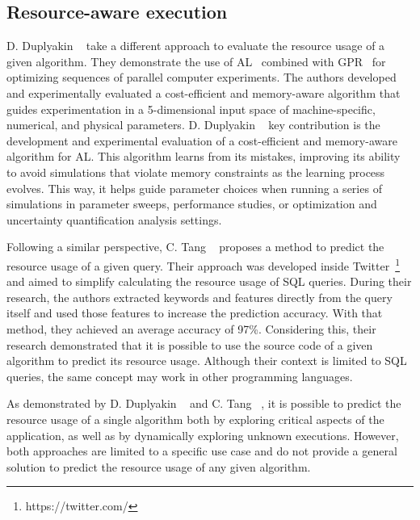 \subsection{Resource-aware execution}
\label{subsec:resource-aware-execution}

D. Duplyakin \etal~\cite{duplyakin2018} take a different approach to evaluate the resource usage of a given algorithm.
They demonstrate the use of \ac{AL}~\cite{active-learning} combined with \ac{GPR}~\cite{gaussian-process-regression} for optimizing sequences of parallel computer experiments.
The authors developed and experimentally evaluated a cost-efficient and memory-aware algorithm that guides experimentation in a 5-dimensional input space of machine-specific, numerical, and physical parameters.
D. Duplyakin \etal~\cite{duplyakin2018} key contribution is the development and experimental evaluation of a cost-efficient and memory-aware algorithm for \ac{AL}.
This algorithm learns from its mistakes, improving its ability to avoid simulations that violate memory constraints as the learning process evolves.
This way, it helps guide parameter choices when running a series of simulations in parameter sweeps, performance studies, or optimization and uncertainty quantification analysis settings.

Following a similar perspective, C. Tang \etal~\cite{tang2021} proposes a method to predict the resource usage of a given query.
Their approach was developed inside Twitter~\footnote{https://twitter.com/} and aimed to simplify calculating the resource usage of SQL queries.
During their research, the authors extracted keywords and features directly from the query itself and used those features to increase the prediction accuracy.
With that method, they achieved an average accuracy of 97\%.
Considering this, their research demonstrated that it is possible to use the source code of a given algorithm to predict its resource usage.
Although their context is limited to SQL queries, the same concept may work in other programming languages.

As demonstrated by D. Duplyakin \etal~\cite{duplyakin2018} and C. Tang \etal~\cite{tang2021}, it is possible to predict the resource usage of a single algorithm both by exploring critical aspects of the application, as well as by dynamically exploring unknown executions.
However, both approaches are limited to a specific use case and do not provide a general solution to predict the resource usage of any given algorithm.
